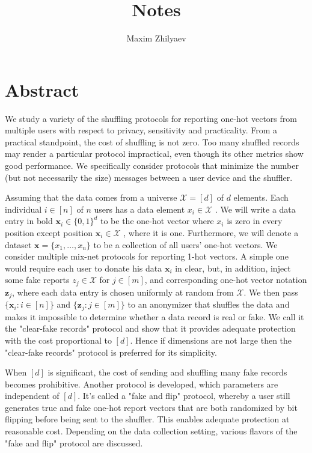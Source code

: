 \documentclass[11pt]{article}
\title{Notes}
\author{Maxim Zhilyaev}
\newcommand{\bbx}{\pmb{x}}
\newcommand{\bbz}{\pmb{z}}
\newcommand{\cX}{\mathcal{X}}
\begin{document}
\maketitle

\section{Abstract}
We study a variety of the shuffling protocols for reporting one-hot vectors from multiple users with respect to privacy, sensitivity and practicality.  From a practical standpoint, the cost of shuffling is not zero. Too many shuffled records may render a particular protocol impractical, even though its other metrics show good performance. We specifically consider protocols that minimize the number (but not necessarily the size) messages between a user device and the shuffler.

Assuming that the data comes from a universe $\cX = [d]$ of $d$ elements. Each individual $i \in [n]$ of $n$ users has a data element $x_i\in \cX$ . We will write a data entry in bold $\bbx_i \in \{0, 1\}^d $ to be the one-hot vector where $x_i$ is zero in every position except position $\bbx_i \in \cX$ , where it is one. Furthermore, we will denote a dataset $\bbx = \{x_1,\dots ,x_n\}$ to be a collection of all users' one-hot vectors. We consider multiple mix-net protocols for reporting 1-hot vectors.  A simple one would require each user to donate his data $\bbx_i$ in clear, but, in addition, inject some fake reports $z_j\in \cX$ for $j \in [m]$, and corresponding one-hot vector notation $\bbz_j$, where each data entry is chosen uniformly at random from $\cX$. We then pass $\{\bbx_i : i \in [n]\}$ and $\{\bbz_j : j \in [m]\} $ to an anonymizer that shuffles the data and makes it impossible to determine whether a data record is real or fake.  We call it the "clear-fake records" protocol and show that it provides adequate protection with the cost proportional to $[d]$. Hence if dimensions are not large then the "clear-fake records" protocol is preferred for its simplicity. 

When $[d]$ is significant, the cost of sending and shuffling many fake records becomes prohibitive. Another protocol is developed,  which parameters are independent of $[d]$.  It's called a "fake and flip" protocol, whereby  a user still generates true and fake one-hot report vectors that are both randomized by bit flipping before being sent to the shuffler.  This enables adequate protection at reasonable cost. Depending on the data collection setting, various flavors of the "fake and flip" protocol are discussed.
\end{document}
